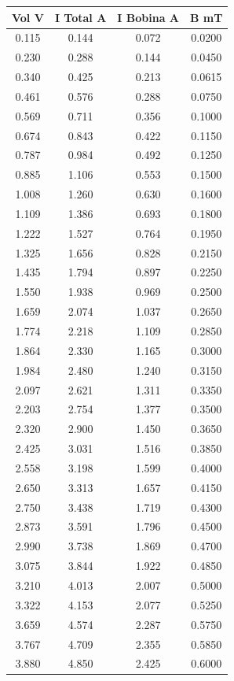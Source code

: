\documentclass{article}
\begin{document}
\begin{center}
\small
\centering
\begin{tabular}{|c|c|c|c|}
\hline
\textbf{Vol V} & \textbf{I Total A} & \textbf{I Bobina A} & \textbf{B mT} \\
\hline
0.115 & 0.144 & 0.072 & 0.0200 \\ \hline
0.230 & 0.288 & 0.144 & 0.0450 \\ \hline
0.340 & 0.425 & 0.213 & 0.0615 \\ \hline
0.461 & 0.576 & 0.288 & 0.0750 \\ \hline
0.569 & 0.711 & 0.356 & 0.1000 \\ \hline
0.674 & 0.843 & 0.422 & 0.1150 \\ \hline
0.787 & 0.984 & 0.492 & 0.1250 \\ \hline
0.885 & 1.106 & 0.553 & 0.1500 \\ \hline
1.008 & 1.260 & 0.630 & 0.1600 \\ \hline
1.109 & 1.386 & 0.693 & 0.1800 \\ \hline
1.222 & 1.527 & 0.764 & 0.1950 \\ \hline
1.325 & 1.656 & 0.828 & 0.2150 \\ \hline
1.435 & 1.794 & 0.897 & 0.2250 \\ \hline
1.550 & 1.938 & 0.969 & 0.2500 \\ \hline
1.659 & 2.074 & 1.037 & 0.2650 \\ \hline
1.774 & 2.218 & 1.109 & 0.2850 \\ \hline
1.864 & 2.330 & 1.165 & 0.3000 \\ \hline
1.984 & 2.480 & 1.240 & 0.3150 \\ \hline
2.097 & 2.621 & 1.311 & 0.3350 \\ \hline
2.203 & 2.754 & 1.377 & 0.3500 \\ \hline
2.320 & 2.900 & 1.450 & 0.3650 \\ \hline
2.425 & 3.031 & 1.516 & 0.3850 \\ \hline
2.558 & 3.198 & 1.599 & 0.4000 \\ \hline
2.650 & 3.313 & 1.657 & 0.4150 \\ \hline
2.750 & 3.438 & 1.719 & 0.4300 \\ \hline
2.873 & 3.591 & 1.796 & 0.4500 \\ \hline
2.990 & 3.738 & 1.869 & 0.4700 \\ \hline
3.075 & 3.844 & 1.922 & 0.4850 \\ \hline
3.210 & 4.013 & 2.007 & 0.5000 \\ \hline
3.322 & 4.153 & 2.077 & 0.5250 \\ \hline
3.659 & 4.574 & 2.287 & 0.5750 \\ \hline
3.767 & 4.709 & 2.355 & 0.5850 \\ \hline
3.880 & 4.850 & 2.425 & 0.6000 \\ \hline
\end{tabular}

\label{tab:datos}
\end{center}
\end{document}
